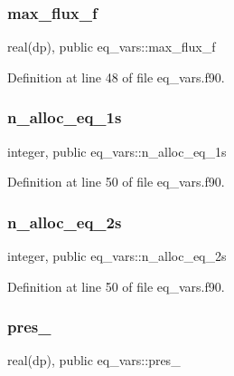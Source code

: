 \subsubsection{\texorpdfstring{max\+\_\+flux\+\_\+f}{max\_flux\_f}}
{\footnotesize\ttfamily real(dp), public eq\+\_\+vars\+::max\+\_\+flux\+\_\+f}



Definition at line 48 of file eq\+\_\+vars.\+f90.

\mbox{\label{namespaceeq__vars_aed1853ac20f0da0be39ab8ef82993c4d}} 
\subsubsection{\texorpdfstring{n\+\_\+alloc\+\_\+eq\+\_\+1s}{n\_alloc\_eq\_1s}}
{\footnotesize\ttfamily integer, public eq\+\_\+vars\+::n\+\_\+alloc\+\_\+eq\+\_\+1s}



Definition at line 50 of file eq\+\_\+vars.\+f90.

\mbox{\label{namespaceeq__vars_af75297445b32de13371da989074dd454}} 
\subsubsection{\texorpdfstring{n\+\_\+alloc\+\_\+eq\+\_\+2s}{n\_alloc\_eq\_2s}}
{\footnotesize\ttfamily integer, public eq\+\_\+vars\+::n\+\_\+alloc\+\_\+eq\+\_\+2s}



Definition at line 50 of file eq\+\_\+vars.\+f90.

\mbox{\label{namespaceeq__vars_abce8bbe23c333a591a2ee5cef9512de9}} 
\subsubsection{\texorpdfstring{pres\+\_}{pres\_0}}
{\footnotesize\ttfamily real(dp), public eq\+\_\+vars\+::pres\+\_}



